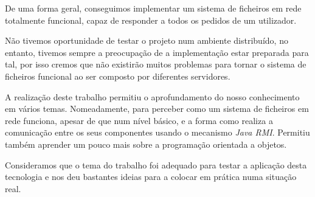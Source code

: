 \documentclass{article}
\begin{document}
De uma forma geral, conseguimos implementar um sistema de ficheiros em rede totalmente funcional, capaz de responder a todos os pedidos de um utilizador.

Não tivemos oportunidade de testar o projeto num ambiente distribuído, no entanto, tivemos sempre a preocupação de a implementação estar preparada para tal, por isso cremos que não existirão muitos problemas para tornar o sistema de ficheiros funcional ao ser composto por diferentes servidores.

A realização deste trabalho permitiu o aprofundamento do nosso conhecimento em vários temas. Nomeadamente, para perceber como um sistema de ficheiros em rede funciona, apesar de que num nível básico, e a forma como realiza a comunicação entre os seus componentes usando o mecanismo \textit{Java RMI}. Permitiu também aprender um pouco mais sobre a programação orientada a objetos.

Consideramos que o tema do trabalho foi adequado para testar a aplicação desta tecnologia e nos deu bastantes ideias para a colocar em prática numa situação real.
\end{document}
